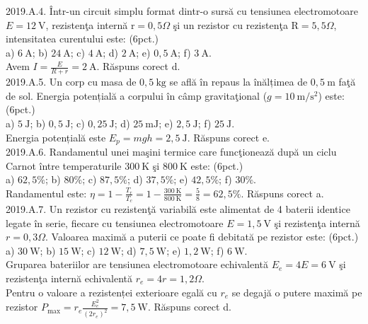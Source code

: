 2019.A.4. Într-un circuit simplu format dintr-o sursă cu tensiunea electromotoare $E=12 \mathrm{~V}$, rezistenţa internă $\mathrm{r}=0,5 \Omega$ şi un rezistor cu rezistenţa $\mathrm{R}=5,5 \Omega$, intensitatea curentului este: (6pct.)\\ a) $6 \mathrm{~A}$; b) $24 \mathrm{~A}$; c) $4 \mathrm{~A}$; d) $2 \mathrm{~A}$; e) $0,5 \mathrm{~A}$; f) $3 \mathrm{~A}$.\\ Avem $I=\frac{E}{R+r}=2 \mathrm{~A}$. Răspuns corect d.\\

2019.A.5. Un corp cu masa de $0,5 \mathrm{~kg}$ se află în repaus la înălțimea de $0,5 \mathrm{~m}$ faţă de sol. Energia potențială a corpului în câmp gravitaţional ($g=10 \mathrm{~m} / \mathrm{s}^{2}$) este: (6pct.)\\ a) $5 \mathrm{~J}$; b) $0,5 \mathrm{~J}$; c) $0,25 \mathrm{~J}$; d) $25 \mathrm{~mJ}$; e) $2,5 \mathrm{~J}$; f) $25 \mathrm{~J}$.\\ Energia potențială este $E_{p}=mgh=2,5 \mathrm{~J}$. Răspuns corect e.\\

2019.A.6. Randamentul unei maşini termice care funcţionează după un ciclu Carnot între temperaturile $300 \mathrm{~K}$ şi $800 \mathrm{~K}$ este: (6pct.)\\ a) $62,5 \%$; b) $80 \%$; c) $87,5 \%$; d) $37,5 \%$; e) $42,5 \%$; f) $30 \%$.\\ Randamentul este: $\eta=1-\frac{T_{r}}{T_{c}}=1-\frac{300 \mathrm{~K}}{800 \mathrm{~K}}=\frac{5}{8}=62,5 \%$. Răspuns corect a.\\

2019.A.7. Un rezistor cu rezistenţă variabilă este alimentat de 4 baterii identice legate în serie, fiecare cu tensiunea electromotoare $E=1,5 \mathrm{~V}$ şi rezistenţa internă $r=0,3 \Omega$. Valoarea maximă a puterii ce poate fi debitată pe rezistor este: (6pct.)\\ a) $30 \mathrm{~W}$; b) $15 \mathrm{~W}$; c) $12 \mathrm{~W}$; d) $7,5 \mathrm{~W}$; e) $1,2 \mathrm{~W}$; f) $6 \mathrm{~W}$.\\ Gruparea bateriilor are tensiunea electromotoare echivalentă $E_{e}=4 E=6 \mathrm{~V}$ şi rezistenţa internă echivalentă $r_{e}=4 r=1,2 \Omega$.\\ Pentru o valoare a rezistenței exterioare egală cu $r_{e}$ se degajă o putere maximă pe rezistor $P_{\max}=r_{e} \frac{E_{e}^{2}}{\left(2 r_{e}\right)^{2}}=7,5 \mathrm{~W}$. Răspuns corect d.\\

